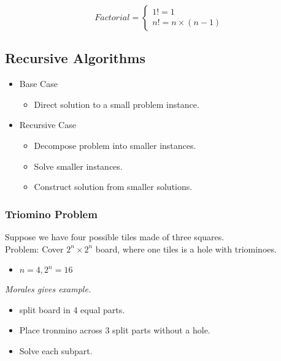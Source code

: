 \documentclass[12pt]{article}
\begin{document}
\begin{equation}
  Factorial = \left\{
    \begin{array}{rl}
      1! = 1 \\
      n! = n \times (n - 1)
    \end{array} \right.
\end{equation}

\subsection{Recursive Algorithms}
\begin{itemize}
\item Base Case

\begin{itemize}
\item Direct solution to a small problem instance.
\end{itemize}

\item Recursive Case

\begin{itemize}
\item Decompose problem into smaller instances.
\item Solve smaller instances.
\item Construct solution from smaller solutions.
\end{itemize}

\end{itemize}

\subsubsection{Triomino Problem}
Suppose we have four possible tiles made of three squares. \\

\noindent
Problem: Cover $2^n \times 2^n$ board, where one tiles is a hole with triominoes.

\begin{itemize}
\item $n = 4, 2^n = 16$
\end{itemize}

\textit{Morales gives example.}

\begin{itemize}
\item split board in 4 equal parts.
\item Place tronmino across 3 split parts without a hole.
\item Solve each subpart.
\end{itemize}
\end{document}
